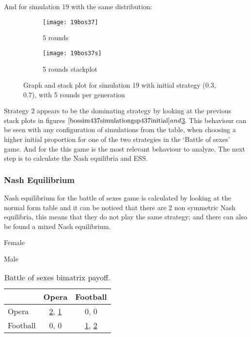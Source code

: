 And for simulation 19 with the same distribution:
\begin{figure}[H]       
    \centering
    \begin{subfigure}[b]{0.3\textwidth}
	\centering
	{\texttt{[image: 19bos37]}}   
    	\caption{5 rounds}
	\label{fig:bossim1937}
    \end{subfigure}
    \hfill
    \begin{subfigure}[b]{0.3\textwidth}
	\centering
	{\texttt{[image: 19bos37s]}}   
    	\caption{5 rounds stackplot}
	\label{fig:bossim1937s}
    \end{subfigure}
    \caption{Graph and stack plot for simulation 19 with initial strategy (0.3, 0.7), with 5 rounds per generation}
    \label{bossim1937simulationgsp1937initial}
\end{figure}
Strategy 2 appears to be the dominating strategy by looking at the previous stack plots in figures $\ref{bossim437simulationgsp437initial} and $\ref{bossim1937simulationgsp1937initial}. This behaviour can be seen with any configuration of simulations from the table, when choosing a higher initial proportion for one of the two strategies in the `Battle of sexes' game. And for the this game is the most relevant behaviour to analyze. The next step is to calculate the Nash equilibria and ESS.


\subsubsection{Nash Equilibrium}
 Nash equilibrium for the battle of sexes game is calculated by looking at the normal form table and it can be noticed that there are 2 non symmetric Nash equilibria, this means that they do not play the same strategy; and there can also be found a mixed Nash equilibrium.

\begin{table}[H]
\begin{center}
Female

Male
\begin{tabular}{|l|c|c|}
\hline
 & Opera & Football\\ 
\hline
Opera & \underline{2}, \underline{1} & 0, 0\\
\hline
Football & 0, 0 & \underline{1}, \underline{2}\\
\hline
\end{tabular}

\caption{ Battle of sexes bimatrix payoff.}
\label{fig:mpnashbos}	
\end{center}
\end{table}

